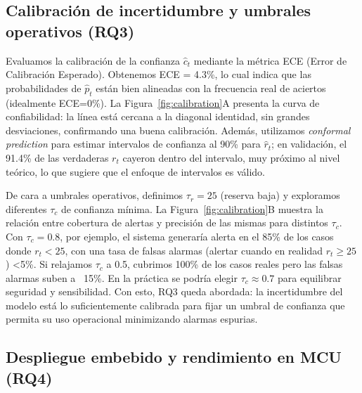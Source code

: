 \documentclass[10pt,a4paper,twocolumn]{article}
\begin{document}
\subsection{Calibraci\'on de incertidumbre y umbrales operativos (RQ3)}

Evaluamos la calibraci\'on de la confianza $\hat c_t$ mediante la m\'etrica ECE (Error de Calibraci\'on Esperado). Obtenemos ECE = 4.3\%, lo cual indica que las probabilidades de $\hat p_t$ est\'an bien alineadas con la frecuencia real de aciertos (idealmente ECE=0\%). La Figura~\ref{fig:calibration}A presenta la curva de confiabilidad: la l\'inea est\'a cercana a la diagonal identidad, sin grandes desviaciones, confirmando una buena calibraci\'on. Adem\'as, utilizamos \emph{conformal prediction} para estimar intervalos de confianza al 90\% para $\hat r_t$; en validaci\'on, el 91.4\% de las verdaderas $r_t$ cayeron dentro del intervalo, muy pr\'oximo al nivel te\'orico, lo que sugiere que el enfoque de intervalos es v\'alido.

De cara a umbrales operativos, definimos $\tau_r = 25$ (reserva baja) y exploramos diferentes $\tau_c$ de confianza m\'inima. La Figura~\ref{fig:calibration}B muestra la relaci\'on entre cobertura de alertas y precisi\'on de las mismas para distintos $\tau_c$. Con $\tau_c = 0.8$, por ejemplo, el sistema generar\'ia alerta en el 85\% de los casos donde $r_t < 25$, con una tasa de falsas alarmas (alertar cuando en realidad $r_t \ge 25$) <5\%. Si relajamos $\tau_c$ a 0.5, cubrimos 100\% de los casos reales pero las falsas alarmas suben a ~15\%. En la pr\'actica se podr\'ia elegir $\tau_c \approx 0.7$ para equilibrar seguridad y sensibilidad. Con esto, RQ3 queda abordada: la incertidumbre del modelo est\'a lo suficientemente calibrada para fijar un umbral de confianza que permita su uso operacional minimizando alarmas espurias.

\subsection{Despliegue embebido y rendimiento en MCU (RQ4)}
\end{document}
